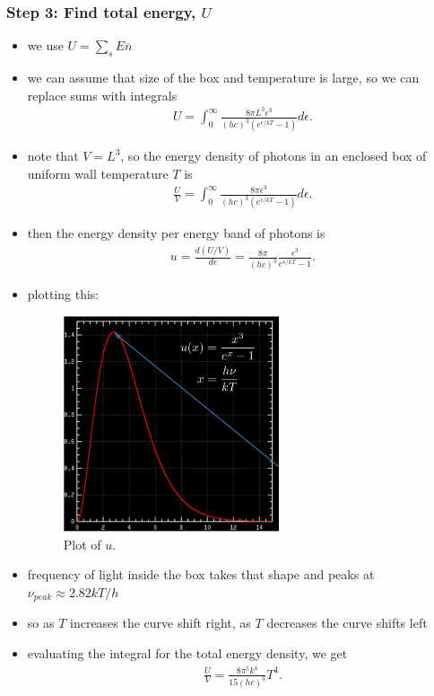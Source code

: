 \documentclass[10pt]{article}
\begin{document}
\subsubsection*{Step 3: Find total energy, $U$}
\begin{itemize}
    \item we use $U = \sum_{s} E\overline{n}$
    \item we can assume that size of the box and temperature is large, so we can replace sums with integrals
        \begin{gather*}
            U = \int_{0}^{\infty} \frac{8\pi L^3 \epsilon^3}{(hc)^3(e^{\epsilon / kT} - 1)} d \epsilon 
        .\end{gather*}
    \item note that $V = L^3$, so the energy density of photons in an enclosed box of uniform wall temperature $T$ is 
        \begin{gather*}
            \frac{U}{V} = \int_{0}^{\infty} \frac{8\pi \epsilon^3}{(hc)^3(e^{\epsilon / kT} - 1)} d \epsilon 
        .\end{gather*}
    \item then the energy density per energy band of photons is
        \begin{gather*}
            u = \frac{d(U / V)}{d \epsilon} = \frac{8\pi}{(hc)^3}\frac{\epsilon^3}{e^{\epsilon / kT} - 1}
        .\end{gather*}
    \item plotting this: 
        \begin{figure}[H]
            \centering
            \includegraphics[width=0.6\textwidth]{blackbodyEnergy}
            \caption{Plot of $u$.}
            \label{fig:blackbodyEnergy}
        \end{figure}
    \item frequency of light inside the box takes that shape and peaks at $\nu_{peak} \approx 2.82kT / h$
    \item so as $T$ increases the curve shift right, as $T$ decreases the curve shifts left
    \item evaluating the integral for the total energy density, we get 
        \begin{gather*}
            \frac{U}{V} = \frac{8\pi^5 k^4}{15(hc)^3}T^4
        .\end{gather*}
\end{itemize}
\end{document}
